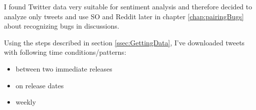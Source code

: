 I found Twitter data very suitable for sentiment analysis and therefore decided to analyze only tweets and use SO and Reddit later in chapter \ref{chap:pairingBugs}  about recognizing bugs in discussions.

Using the steps described in section \ref{ssec:GettingData}, I've downloaded tweets with following time conditions/patterns:
\begin{itemize}
\item between two immediate releases
\item on release dates
\item weekly
\end{itemize}

